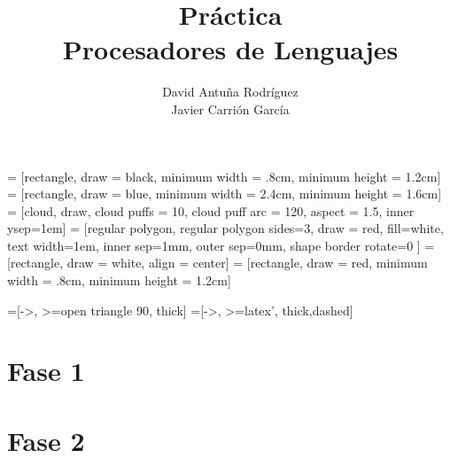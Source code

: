 \documentclass[11pt]{article}
\title{Práctica\\\Large Procesadores de Lenguajes}
\author{David Antuña Rodríguez\\Javier Carrión García}
\date{}
\begin{document}
  = [rectangle, draw = black, minimum width = .8cm, minimum height = 1.2cm]
  = [rectangle, draw = blue, minimum width = 2.4cm, minimum height = 1.6cm]
   = [cloud, draw, cloud puffs = 10, cloud puff arc = 120, aspect = 1.5, inner ysep=1em]
   = [regular polygon, regular polygon sides=3, draw = red, fill=white, text width=1em, inner sep=1mm, outer sep=0mm, shape border rotate=0 ]
  = [rectangle, draw = white, align = center]
  = [rectangle, draw = red, minimum width = .8cm, minimum height = 1.2cm]

  =[->, >=open triangle 90, thick]
  =[->, >=latex', thick,dashed]

  \raggedright
  \maketitle
  \newpage
  \tableofcontents
  \newpage

  \section{Fase 1}
  {
    \let\section\subsection
    \let\subsection\subsubsection
    
  }

  \section{Fase 2}
  {
    \let\section\subsection
    \let\subsection\subsubsection
    
  }
\end{document}
